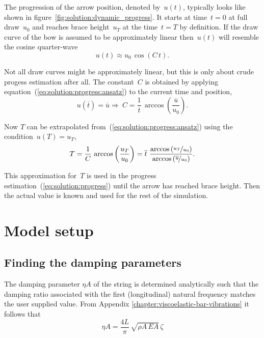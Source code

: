 The progression of the arrow position, denoted by~$u(t)$, typically looks like shown in figure~\ref{fig:solution:dynamic_progress}.
It starts at time~$t = 0$ at full draw~$u_0$ and reaches brace height~$u_T$ at the time~$t = T$ by definition.
If the draw curve of the bow is assumed to be approximately linear then~$u(t)$ will resemble the cosine quarter-wave
%
\begin{equation}
u(t) \approx u_{0}\,\cos{\left(C\,t\right)}.\label{eq:solution:progress:ansatz}
\end{equation}

Not all draw curves might be approximately linear, but this is only about crude progess estimation after all.
The constant~$C$ is obtained by applying equation~(\ref{eq:solution:progress:ansatz}) to the current time and position,
%
\begin{equation}
u(\overline{t}) = \overline{u} \Rightarrow \ C = \frac{1}{\overline{t}}\,\arccos{\left(\frac{\overline{u}}{u_0}\right)}.\label{eq:solution:progress:constant}
\end{equation}

Now $T$ can be extrapolated from~(\ref{eq:solution:progress:ansatz}) using the condition~$u(T) = u_T$,
%
\begin{align}
T = \frac{1}{C}\,\arccos{\left(\frac{u_T}{u_0}\right)} = \overline{t}\ \frac{\arccos{\left(\nicefrac{u_T}{u_0}\right)}}{\arccos{\left(\nicefrac{\overline{u}}{u_0}\right)}}.
\end{align}

This approximation for~$T$ is used in the progress estimation~(\ref{eq:solution:progress}) until the arrow has reached brace height. Then the actual value is known and used for the rest of the simulation.




\newpage
\section{Model setup}

\subsection{Finding the damping parameters}

The damping parameter $\eta A$ of the string is determined analytically such that the damping ratio associated with the first (longitudinal) natural frequency matches the user supplied value. From Appendix \ref{chapter:viscoelastic-bar-vibrations} it follows that
%
\begin{equation}
\eta A = \frac{4L}{\pi}\,\sqrt{\rho A\,EA}\,\zeta
\end{equation}


